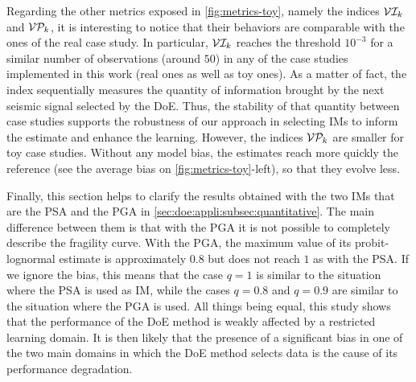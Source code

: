     Regarding the other metrics exposed in  \cref{fig:metrics-toy}, namely the indices $\mathcal{V}\mathcal{I}_k$ and $\mathcal{V}\mathcal{P}_k$, it is interesting to notice that their behaviors are comparable with the ones of the real case study. In particular, $\mathcal{V}\mathcal{I}_k$ reaches the threshold $10^{-3}$ for a similar number of observations (around $50$) in any of the case studies implemented in this work (real ones as well as toy ones).
    As a matter of fact, the index sequentially measures the quantity of information brought by the next seismic signal selected by the DoE. Thus, the stability of that quantity between case studies supports the robustness of our approach in selecting IMs to inform the estimate and enhance the learning.
    However, the indices $\mathcal{V}\mathcal{P}_k$ are smaller for toy case studies. Without any model bias, the estimates reach more quickly the reference (see the average bias on  \cref{fig:metrics-toy}-left), so that they evolve less.
    
    
    {Finally, this section helps to clarify the results obtained with the two IMs that are the PSA and the PGA in \cref{sec:doe:appli:subsec:quantitative}. The main difference between them is that with the PGA it is not possible to completely describe the fragility curve. With the PGA, the maximum value of its probit-lognormal estimate is approximately $0.8$ but does not reach $1$ as with the PSA. If we ignore the bias, this means that the case $q=1$ is similar to the situation where the PSA is used as IM, while the cases  $q=0.8$ and $q=0.9$ are similar to the situation where the PGA is used. All things being equal, this study shows that the performance of the DoE method is weakly affected by a restricted learning domain. It is then likely that the presence of a significant bias in one of the two main domains in which the DoE method selects data is the cause of its performance degradation.}
    

